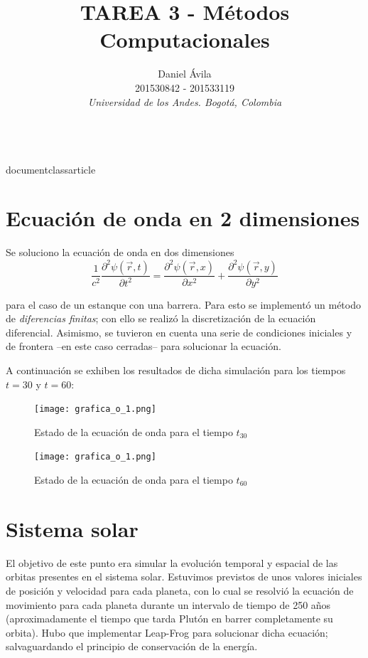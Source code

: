 \\documentclass{article}
\begin{document}
\title{TAREA 3 - Métodos Computacionales}
\author{Daniel Ávila \\  201530842 - 201533119  \\ \textit{Universidad de los Andes. Bogotá, Colombia}}
\maketitle


\section{Ecuación de onda en 2 dimensiones}
Se soluciono la ecuación de onda en dos dimensiones $$\frac{1}{c^2}\frac{\partial^2\psi(\vec r,t)}{\partial t^2}= \frac{\partial^2\psi(\vec r,x)}{\partial x^2} + \frac{\partial^2\psi(\vec r,y)}{\partial y^2}$$ 

para el caso de un estanque con una barrera. Para esto se implementó un método de \textit{diferencias finitas}; con ello se realizó la discretización de la ecuación diferencial. Asimismo, se tuvieron en cuenta una serie de condiciones iniciales y de frontera –en este caso cerradas– para solucionar la ecuación.

A continuación se exhiben los resultados de dicha simulación para los tiempos $t=30$  y $t=60$:

\begin{figure}[h!]
\centering
\texttt{[image: grafica\_o\_1.png]}
\caption{Estado de la ecuación de onda para el tiempo $t_{30}$}
\end{figure}

\begin{figure}[h!]
\centering
\texttt{[image: grafica\_o\_1.png]}
\caption{Estado de la ecuación de onda para el tiempo $t_{60}$}
\end{figure}

\section{Sistema solar}
El objetivo de este punto era simular la evolución temporal y espacial de las orbitas presentes en el sistema solar. Estuvimos previstos de unos valores iniciales de posición y velocidad para cada planeta, con lo cual se resolvió la ecuación de movimiento para cada planeta durante un intervalo de tiempo de 250 años (aproximadamente el tiempo que tarda Plutón en barrer completamente su orbita). Hubo que implementar Leap-Frog para solucionar dicha ecuación; salvaguardando el principio de conservación de la energía. 
\end{document}
